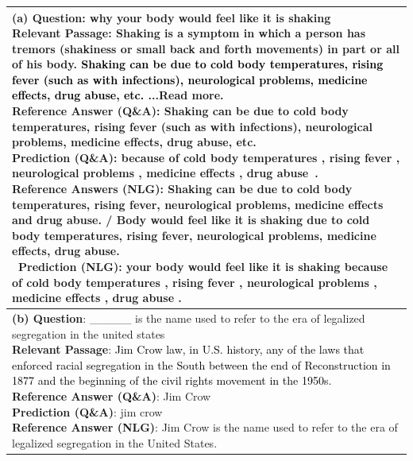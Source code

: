 \documentclass[11pt,a4paper]{article}
\newcommand{\cmark}{\ding{51}}%
\theoremstyle{mydef}
\theoremstyle{myprob}
\begin{document}
\begin{table}[h!]
\centering
{\footnotesize
\tabcolsep=1pt
\vspace{0.5pt}
\begin{tabular}{p{50em}}
\hline
\vspace{0.5pt}
\pbox{50em}{
\textbf{(a) Question}: why your body would feel like it is shaking\\
\textbf{Relevant Passage}: Shaking is a symptom in which a person has tremors (shakiness or small back and forth movements) in part or all of his body. \textcolor{black}{Shaking can be due to cold body temperatures, rising fever (such as with infections), neurological problems, medicine effects, drug abuse, etc.} ...Read more. \\
\textbf{Reference Answer (Q\&A)}: Shaking can be due to cold body temperatures, rising fever (such as with infections), neurological problems, medicine effects, drug abuse, etc.  \\
\textbf{Prediction (Q\&A)}: because of cold body temperatures , rising fever , neurological problems , medicine effects , drug abuse~.~\cmark\\
\textbf{Reference Answers (NLG)}: Shaking can be due to cold body temperatures, rising fever, neurological problems, medicine effects and drug abuse. / 
Body would feel like it is shaking due to cold body temperatures, rising fever, neurological problems, medicine effects, drug abuse. \\\
\textbf{Prediction (NLG)}: your body would feel like it is shaking because of cold body temperatures , rising fever , neurological problems , medicine effects , drug abuse . \cmark
}
\vspace{1pt}
\\ \hline
\vspace{0.5pt}
\pbox{50em}{
\textbf{(b) Question}: \_\_\_\_\_ is the name used to refer to the era of legalized segregation in the united states \\
\textbf{Relevant Passage}: \textcolor{black}{Jim Crow law, in U.S. history, any of the laws that enforced racial segregation in the South between the end of Reconstruction in 1877 and the beginning of the civil rights movement in the 1950s.}
\\
\textbf{Reference Answer (Q\&A)}: Jim Crow \\
\textbf{Prediction (Q\&A)}: jim crow \cmark \\
\textbf{Reference Answer (NLG)}: Jim Crow is the name used to refer to the era of legalized segregation in the United States. \\
}
\end{tabular}}
\end{table}
\end{document}
